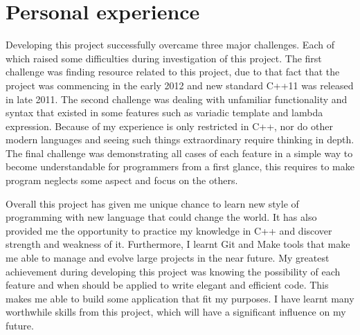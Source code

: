 \documentclass[11pt]{report}
\begin{document}
\section{Personal experience}
\label{sec: personal experience}
Developing this project successfully overcame three major challenges. Each of which raised some difficulties during investigation of this project. The first challenge was finding resource related to this project, due to that fact that the project was commencing in the early 2012 and new standard C++11 was released in late 2011. The second challenge was dealing with unfamiliar functionality and syntax that existed in some features such as variadic template and lambda expression. Because of my experience is only restricted in C++, nor do other modern languages and seeing such things extraordinary require thinking in depth. The final challenge was demonstrating all cases of each feature in a simple way to become understandable for programmers from a first glance, this requires to make program neglects some aspect and focus on the others.

Overall this project has given me unique chance to learn new style of programming with new language that could change the world. It has also provided me the opportunity to practice my knowledge in C++ and discover strength and weakness of it. Furthermore, I learnt Git and Make tools that make me able to manage and evolve large projects in the near future. My greatest achievement during developing this project was knowing the possibility of each feature and when should be applied to write elegant and efficient code. This makes me able to build some application that fit my purposes. I have learnt many worthwhile skills from this project, which will have a significant influence on my future.


	
\end{document}
